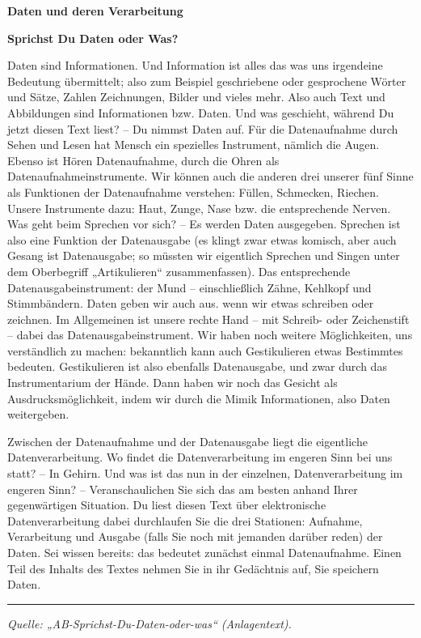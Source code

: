 \documentclass[11pt,a4paper]{scrartcl}
\begin{document}
	
	{\Large\bfseries Daten und deren Verarbeitung}\par
	{\large\bfseries Sprichst Du Daten oder Was?}
	
	Daten sind Informationen. Und Information ist alles das was uns irgendeine Bedeutung übermittelt; also zum Beispiel geschriebene oder gesprochene Wörter und Sätze, Zahlen Zeichnungen, Bilder und vieles mehr. Also auch Text und Abbildungen sind Informationen bzw. Daten. Und was geschieht, während Du jetzt diesen Text liest? – Du nimmst Daten auf. Für die Datenaufnahme durch Sehen und Lesen hat Mensch ein spezielles Instrument, nämlich die Augen. Ebenso ist Hören Datenaufnahme, durch die Ohren als Datenaufnahmeinstrumente. Wir können auch die anderen drei unserer fünf Sinne als Funktionen der Datenaufnahme verstehen: Füllen, Schmecken, Riechen. Unsere Instrumente dazu: Haut, Zunge, Nase bzw. die entsprechende Nerven. Was geht beim Sprechen vor sich? – Es werden Daten ausgegeben. Sprechen ist also eine Funktion der Datenausgabe (es klingt zwar etwas komisch, aber auch Gesang ist Datenausgabe; so müssten wir eigentlich Sprechen und Singen unter dem Oberbegriff „Artikulieren“ zusammenfassen). Das entsprechende Datenausgabeinstrument: der Mund – einschließlich Zähne, Kehlkopf und Stimmbändern. Daten geben wir auch aus. wenn wir etwas schreiben oder zeichnen. Im Allgemeinen ist unsere rechte Hand – mit Schreib- oder Zeichenstift – dabei das Datenausgabeinstrument. Wir haben noch weitere Möglichkeiten, uns verständlich zu machen: bekanntlich kann auch Gestikulieren etwas Bestimmtes bedeuten. Gestikulieren ist also ebenfalls Datenausgabe, und zwar durch das Instrumentarium der Hände. Dann haben wir noch das Gesicht als Ausdrucksmöglichkeit, indem wir durch  die Mimik Informationen, also Daten weitergeben.
	
	Zwischen der Datenaufnahme und der Datenausgabe liegt die eigentliche Datenverarbeitung. Wo findet die Datenverarbeitung im engeren Sinn bei uns statt? – In Gehirn. Und was ist das nun in der einzelnen, Datenverarbeitung im engeren Sinn? – Veranschaulichen Sie sich das am besten anhand Ihrer gegenwärtigen Situation. Du liest diesen Text über elektronische Datenverarbeitung dabei durchlaufen Sie die drei Stationen: Aufnahme, Verarbeitung und Ausgabe (falls Sie noch mit jemanden darüber reden) der Daten. Sei wissen bereits: das bedeutet zunächst einmal Datenaufnahme. Einen Teil des Inhalts des Textes nehmen Sie in ihr Gedächtnis auf, Sie speichern Daten.
	
	\vspace{1.2em}
	\hrule
	\smallskip
	\small\emph{Quelle: „AB-Sprichst-Du-Daten-oder-was“ (Anlagentext).}
	
\end{document}
